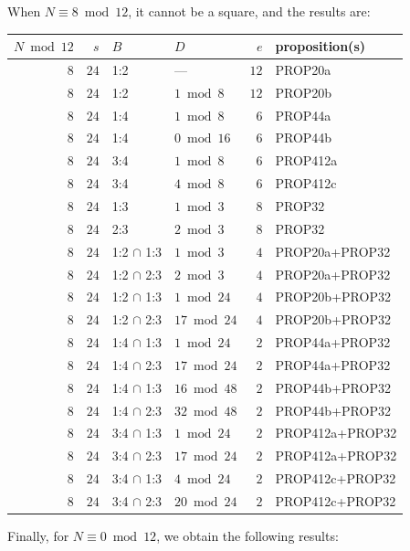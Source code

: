 \documentclass[12pt,twoside,leqno]{article}
\numberwithin{equation}{section}
\begin{document}
When $N\equiv 8\bmod 12$, it cannot be a square, and the results are:
\begin{center}
\begin{tabular}{|r|r||l|l||r||l|}\hline
$N\bmod12$ &  $s$ & $B$          & $D$                            &  $e$ & proposition(s) \\
\hline
$8$ & $24$ & 1:2 & --- & $12$ & PROP20a\\
$8$ & $24$ & 1:2 & $1\bmod 8$ & $12$ & PROP20b\\
$8$ & $24$ & 1:4 & $1\bmod 8$ & $6$ & PROP44a\\
$8$ & $24$ & 1:4 & $0\bmod 16$ & $6$ & PROP44b\\
$8$ & $24$ & 3:4 & $1\bmod 8$ & $6$ & PROP412a\\
$8$ & $24$ & 3:4 & $4\bmod 8$ & $6$ & PROP412c\\
$8$ & $24$ & 1:3 & $1\bmod 3$ & $8$ & PROP32\\
$8$ & $24$ & 2:3 & $2\bmod 3$ & $8$ & PROP32\\
$8$ & $24$ & 1:2 $\cap$ 1:3 & $1\bmod 3$ & $4$ & PROP20a+PROP32\\
$8$ & $24$ & 1:2 $\cap$ 2:3 & $2\bmod 3$ & $4$ & PROP20a+PROP32\\
$8$ & $24$ & 1:2 $\cap$ 1:3 & $1\bmod 24$ & $4$ & PROP20b+PROP32\\
$8$ & $24$ & 1:2 $\cap$ 2:3 & $17\bmod 24$ & $4$ & PROP20b+PROP32\\
$8$ & $24$ & 1:4 $\cap$ 1:3 & $1\bmod 24$ & $2$ & PROP44a+PROP32\\
$8$ & $24$ & 1:4 $\cap$ 2:3 & $17\bmod 24$ & $2$ & PROP44a+PROP32\\
$8$ & $24$ & 1:4 $\cap$ 1:3 & $16\bmod 48$ & $2$ & PROP44b+PROP32\\
$8$ & $24$ & 1:4 $\cap$ 2:3 & $32\bmod 48$ & $2$ & PROP44b+PROP32\\
$8$ & $24$ & 3:4 $\cap$ 1:3 & $1\bmod 24$ & $2$ & PROP412a+PROP32\\
$8$ & $24$ & 3:4 $\cap$ 2:3 & $17\bmod 24$ & $2$ & PROP412a+PROP32\\
$8$ & $24$ & 3:4 $\cap$ 1:3 & $4\bmod 24$ & $2$ & PROP412c+PROP32\\
$8$ & $24$ & 3:4 $\cap$ 2:3 & $20\bmod 24$ & $2$ & PROP412c+PROP32\\
\hline
\end{tabular}
\end{center}
Finally, for $N\equiv 0\bmod 12$, we obtain the following results:
\end{document}
